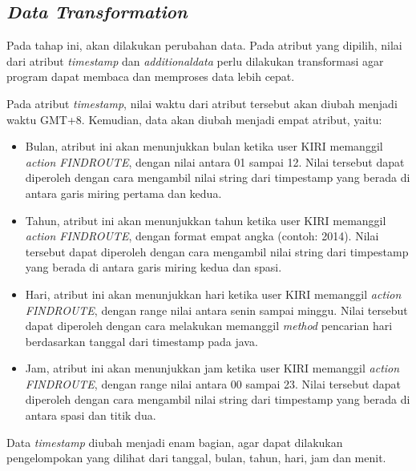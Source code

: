 \subsection{\textsl{Data Transformation}}
Pada tahap ini, akan dilakukan perubahan data. Pada atribut yang dipilih, nilai dari atribut \textsl{timestamp} dan \textsl{additionaldata} perlu dilakukan transformasi agar program dapat membaca dan memproses data lebih cepat. 

Pada atribut \textsl{timestamp}, nilai waktu dari atribut tersebut akan diubah menjadi waktu GMT+8. Kemudian, data akan diubah menjadi empat atribut, yaitu:
\begin{itemize}
	\item Bulan, atribut ini akan menunjukkan bulan ketika user KIRI memanggil \textsl{action FINDROUTE}, dengan nilai antara 01 sampai 12. Nilai tersebut dapat diperoleh dengan cara mengambil nilai string dari timpestamp yang berada di antara garis miring pertama dan kedua.
	\item Tahun, atribut ini akan menunjukkan tahun ketika user KIRI memanggil \textsl{action FINDROUTE}, dengan format empat angka (contoh: 2014). Nilai tersebut dapat diperoleh dengan cara mengambil nilai string dari timpestamp yang berada di antara garis miring kedua dan spasi.
	\item Hari, atribut ini akan menunjukkan hari ketika user KIRI memanggil \textsl{action FINDROUTE}, dengan range nilai antara senin sampai minggu. Nilai tersebut dapat diperoleh dengan cara melakukan memanggil \textsl{method} pencarian hari berdasarkan tanggal dari timestamp pada java.
	\item Jam, atribut ini akan menunjukkan jam ketika user KIRI memanggil \textsl{action FINDROUTE}, dengan range nilai antara 00 sampai 23. Nilai tersebut dapat diperoleh dengan cara mengambil nilai string dari timpestamp yang berada di antara spasi dan titik dua.
\end{itemize}

Data \textsl{timestamp} diubah menjadi enam bagian, agar dapat dilakukan pengelompokan yang dilihat dari tanggal, bulan, tahun, hari, jam dan menit.

